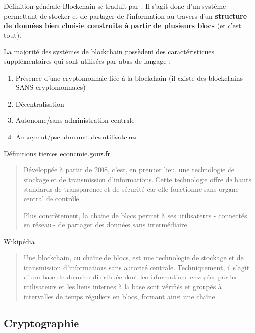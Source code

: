 \begin{frame}{Définition générale}
  Blockchain se traduit par .
  Il s'agit donc d'un système permettant de stocker et de partager de l'information au travers d'un \textbf{structure de données bien choisie construite à partir de plusieurs blocs} (et c'est tout).

  La majorité des systèmes de blockchain possèdent des caractéristiques supplémentaires qui sont utilisées par abus de langage :

  \begin{enumerate}
    \item Présence d'une cryptomonnaie liée à la blockchain (il existe des blockchains SANS cryptomonnaies)
    \item Décentralisation
    \item Autonome/sans administration centrale
    \item Anonymat/pseudonimat des utilisateurs
  \end{enumerate}
\end{frame}

\begin{frame}{Définitions tierces}
  economie.gouv.fr
  \begin{quote}
    Développée à partir de 2008, c'est, en premier lieu, une technologie de stockage et de transmission d’informations. Cette technologie offre de hauts standards de transparence et de sécurité car elle fonctionne sans organe central de contrôle.

    Plus concrètement, la chaîne de blocs permet à ses utilisateurs - connectés en réseau - de partager des données sans intermédiaire.
  \end{quote}


  Wikipédia
  \begin{quote}
    Une blockchain, ou chaîne de blocs, est une technologie de stockage et de transmission d'informations sans autorité centrale. Techniquement, il s'agit d'une base de données distribuée dont les informations envoyées par les utilisateurs et les liens internes à la base sont vérifiés et groupés à intervalles de temps réguliers en blocs, formant ainsi une chaîne.
  \end{quote}
\end{frame}


\subsection{Cryptographie}

